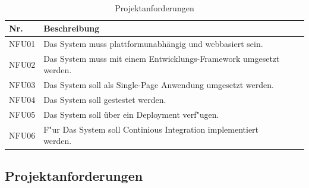 \documentclass[a4paper, 11pt]{scrreprt}
\begin{document}
\begin{table}[H]

\caption{Projektanforderungen}

\ \\

\par

\label{tab:Tabelle1}

\centering

\begin{tabular}{|p{2.5cm} p{12cm}| ll}

\hline
Nr.	& Beschreibung\\

\hline
NFU01 &	Das System muss plattformunabhängig und webbasiert sein. \\

\hline
NFU02 &	Das System muss mit einem Entwicklungs-Framework umgesetzt werden.\\

\hline
NFU03 &	Das System soll als Single-Page Anwendung umgesetzt werden.\\

\hline
NFU04 &	Das System soll gestestet werden.\\

\hline
NFU05 &	Das System soll über ein Deployment verf"ugen.\\

\hline
NFU06 &	F"ur Das System soll Continious Integration implementiert werden.\\

\end{tabular}

\end{table}

\subsection{Projektanforderungen}
\end{document}
